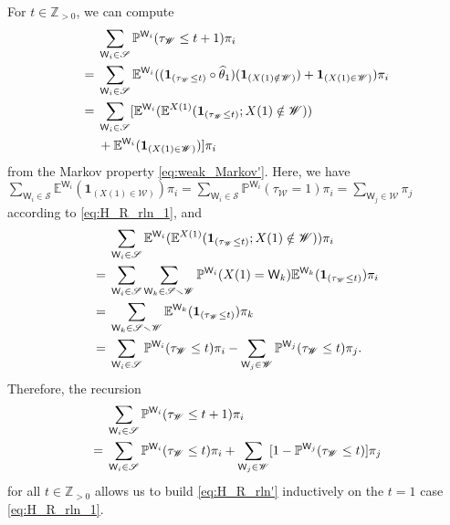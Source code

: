\documentclass[10pt,journal,compsoc]{IEEEtran}
\begin{document}
\begin{IEEEproof}
For $ t\in\mathbb Z_{>0}$, we can compute{\allowdisplaybreaks\begin{align}&
\sum_{\mathsf W_i\in\mathscr S}\mathbb P^{\mathsf W_i}(\tau_{\mathscr W}\leq t+1)\pi_i\notag\\={}&\sum_{\mathsf W_i\in\mathscr S}\mathbb E^{\mathsf W_i}((\mathbf1_{(\tau_{\mathscr W}\leq t)}\circ\widehat\theta_1)(\mathbf1_{(X(1)\notin\mathscr W)})+\mathbf1_{(X(1)\in\mathscr W)})\pi_i\notag\\={}&\sum_{\mathsf W_i\in\mathscr S}[\mathbb E^{\mathsf W_i}(\mathbb E^{X(1)}(\mathbf1_{(\tau_{\mathscr W}\leq t)};X(1)\notin\mathscr W))\notag\\{}&+\mathbb E^{\mathsf W_i}(\mathbf1_{(X(1)\in\mathscr W)})]\pi_i
\end{align}}from the Markov property \eqref{eq:weak_Markov'}. Here, we have  $ \sum_{\mathsf W_i\in\mathscr S}\mathbb E^{\mathsf W_i}(\mathbf1_{(X(1)\in\mathscr W)})\pi_i=\sum_{\mathsf W_i\in\mathscr S}\mathbb P^{\mathsf W_i}(\tau_{\mathscr W}=1)\pi_i=\sum_{\mathsf W_j\in\mathscr W}\pi_j$ according to \eqref{eq:H_R_rln_1}, and{\allowdisplaybreaks\begin{align}&
\sum_{\mathsf W_i\in\mathscr S}\mathbb E^{\mathsf W_i}(\mathbb E^{X(1)}(\mathbf1_{(\tau_{\mathscr W}\leq t)};X(1)\notin\mathscr W))\pi_i\notag\\={}&\sum_{\mathsf W_i\in\mathscr S}\sum_{\mathsf W_{k}\in\mathscr S\smallsetminus\mathscr W}\mathbb P^{\mathsf W_i}(X(1)=\mathsf W_{k})\mathbb E^{\mathsf W_{k}}(\mathbf1_{(\tau_{\mathscr W}\leq t)})\pi_i\notag\\={}&\sum_{\mathsf W_{k}\in\mathscr S\smallsetminus\mathscr W} \mathbb E^{\mathsf W_{k}}(\mathbf1_{(\tau_{\mathscr W}\leq t)})\pi_k\notag\\={}&\sum_{\mathsf W_i\in\mathscr S}\mathbb P^{\mathsf W_i}(\tau_{\mathscr W}\leq t)\pi_i-\sum_{\mathsf W_j\in\mathscr W}\mathbb P^{\mathsf W_j}(\tau_{  \mathscr W}\leq t)\pi_{j}.
\end{align}}Therefore, the recursion\begin{align}&
\sum_{\mathsf W_i\in\mathscr S}\mathbb P^{\mathsf W_i}(\tau_{\mathscr W}\leq t+1)\pi_i\notag\\={}&\sum_{\mathsf W_i\in\mathscr S}\mathbb P^{\mathsf W_i}(\tau_{\mathscr W}\leq t)\pi_i+\sum_{\mathsf W_j\in\mathscr W}[1-\mathbb P^{\mathsf W_j}(\tau_{  \mathscr W}\leq t)]\pi_{j}\label{eq:H_R_rec}
\end{align}for all $t\in\mathbb Z_{>0}$ allows us to  build \eqref{eq:H_R_rln'}  inductively on the  $ t=1$ case \eqref{eq:H_R_rln_1}.   \end{IEEEproof}
\end{document}

